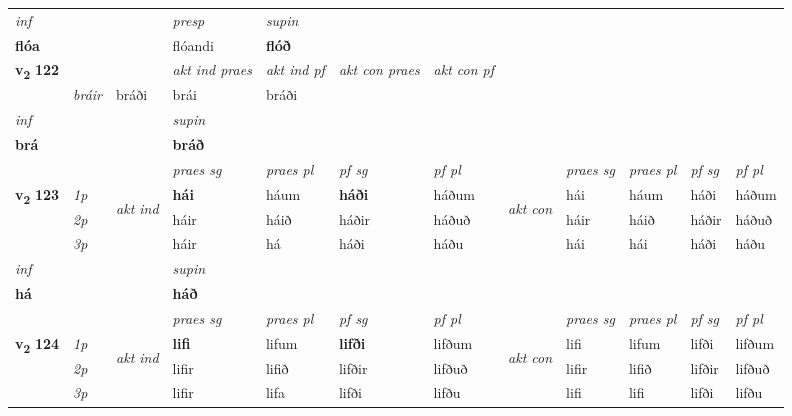 \begin{longtable}[l]{X>{\footnotesize\itshape}llXXXXlXXXX}
   {\textit{inf}} & &     & \textit{presp} & \textit{supin}   \\*
  {\textbf{flóa}} & &     & flóandi &  \textbf{flóð}   \\*

\midrule

\multirow{2}{*}{{{\textbf{v{\textsubscript{2}}} \Large{\textbf{122}}}}}  &&&  \textit{akt ind praes} & \textit{akt ind pf} & \textit{akt con praes} & \textit{akt con pf} \\*
\multicolumn{3}{r}{\textit{það}} & bráir & bráði & brái & bráði \\*

\cmidrule{4-7}
   {\textit{inf}} & &      & \textit{supin}   \\*
  {\textbf{brá}} & &      &  \textbf{bráð}   \\*

\midrule

 & &   & \textit{praes sg}  & \textit{praes pl}    & \textit{ pf sg} & \textit{pf pl} & & \textit{praes sg}  & \textit{praes pl}    & \textit{pf sg} & \textit{pf pl }  \\ \cmidrule{4-7} \cmidrule{9-12}
 \multirow{2}{*}{{{\textbf{v{\textsubscript{2}}} \Large{\textbf{123}}}}}  & 1p & \multirow{3}{*}{\begin{turn}{90}\textit{akt ind}\end{turn}} & \textbf{hái} & háum & \textbf{háði} & háðum & \multirow{3}{*}{\begin{turn}{90}\textit{akt con}\end{turn}} &hái & háum & háði & háðum\\*
 & 2p &  &  háir  & háið & háðir & háðuð & & háir & háið & háðir & háðuð \\*
 & 3p &  & háir & há & háði & háðu & & hái & hái& háði & háðu \\*
\cmidrule{4-7} \cmidrule{9-12}

   {\textit{inf}} & &      & \textit{supin}   \\*
  {\textbf{há}} & &      &  \textbf{háð}   \\*

\midrule

 & &   & \textit{praes sg}  & \textit{praes pl}    & \textit{ pf sg} & \textit{pf pl} & & \textit{praes sg}  & \textit{praes pl}    & \textit{pf sg} & \textit{pf pl }  \\ \cmidrule{4-7} \cmidrule{9-12}
 \multirow{2}{*}{{{\textbf{v{\textsubscript{2}}} \Large{\textbf{124}}}}}  & 1p & \multirow{3}{*}{\begin{turn}{90}\textit{akt ind}\end{turn}} & \textbf{lifi} & lifum & \textbf{lifði} & lifðum & \multirow{3}{*}{\begin{turn}{90}\textit{akt con}\end{turn}} &lifi & lifum & lifði & lifðum\\*
 & 2p &  &  lifir  & lifið & lifðir & lifðuð & & lifir & lifið & lifðir & lifðuð \\*
 & 3p &  & lifir & lifa & lifði & lifðu & & lifi & lifi& lifði & lifðu \\*
\cmidrule{4-7} \cmidrule{9-12}


\end{longtable}
